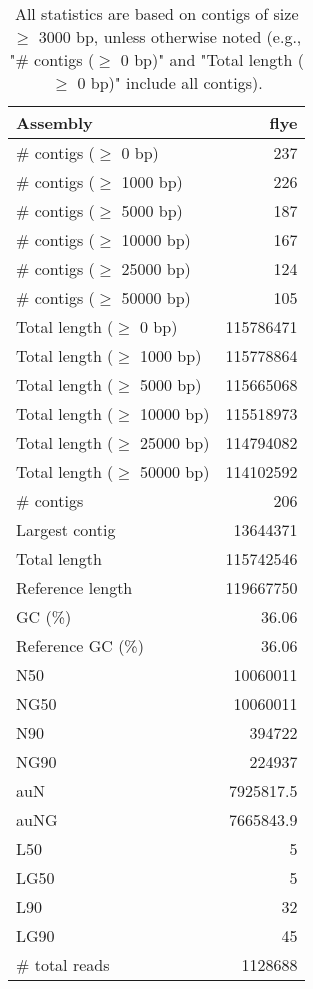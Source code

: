 \documentclass[12pt,a4paper]{article}
\begin{document}
\begin{table}[ht]
\begin{center}
\caption{All statistics are based on contigs of size $\geq$ 3000 bp, unless otherwise noted (e.g., "\# contigs ($\geq$ 0 bp)" and "Total length ($\geq$ 0 bp)" include all contigs).}
\begin{tabular}{|l*{1}{|r}|}
\hline
Assembly & flye \\ \hline
\# contigs ($\geq$ 0 bp) & 237 \\ \hline
\# contigs ($\geq$ 1000 bp) & 226 \\ \hline
\# contigs ($\geq$ 5000 bp) & 187 \\ \hline
\# contigs ($\geq$ 10000 bp) & 167 \\ \hline
\# contigs ($\geq$ 25000 bp) & 124 \\ \hline
\# contigs ($\geq$ 50000 bp) & 105 \\ \hline
Total length ($\geq$ 0 bp) & 115786471 \\ \hline
Total length ($\geq$ 1000 bp) & 115778864 \\ \hline
Total length ($\geq$ 5000 bp) & 115665068 \\ \hline
Total length ($\geq$ 10000 bp) & 115518973 \\ \hline
Total length ($\geq$ 25000 bp) & 114794082 \\ \hline
Total length ($\geq$ 50000 bp) & 114102592 \\ \hline
\# contigs & 206 \\ \hline
Largest contig & 13644371 \\ \hline
Total length & 115742546 \\ \hline
Reference length & 119667750 \\ \hline
GC (\%) & 36.06 \\ \hline
Reference GC (\%) & 36.06 \\ \hline
N50 & 10060011 \\ \hline
NG50 & 10060011 \\ \hline
N90 & 394722 \\ \hline
NG90 & 224937 \\ \hline
auN & 7925817.5 \\ \hline
auNG & 7665843.9 \\ \hline
L50 & 5 \\ \hline
LG50 & 5 \\ \hline
L90 & 32 \\ \hline
LG90 & 45 \\ \hline
\# total reads & 1128688 \\ \hline

\end{tabular}
\end{center}
\end{table}
\end{document}
